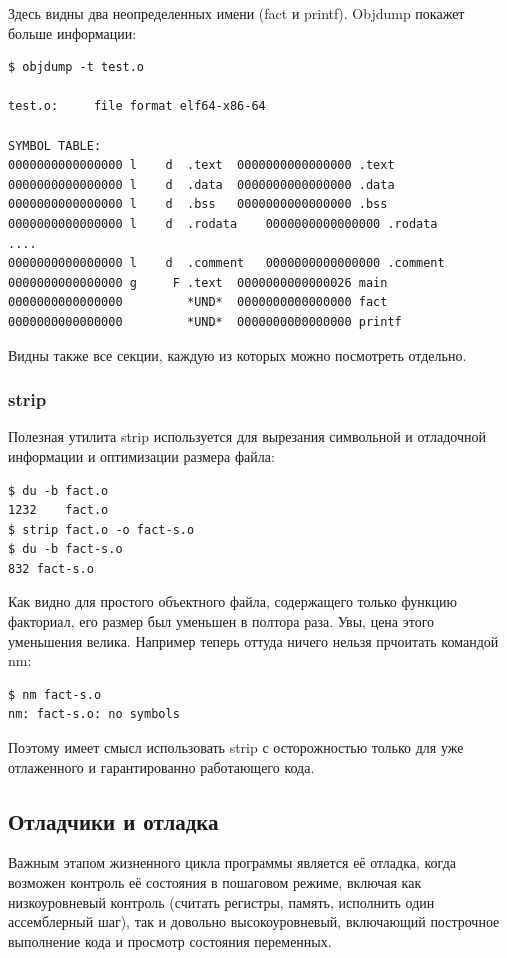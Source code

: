 \documentclass[a4paper,12pt,oneside]{article}
\begin{document}
Здесь видны два неопределенных имени (fact и printf). Objdump покажет больше информации:

\begin{verbatim}
$ objdump -t test.o

test.o:     file format elf64-x86-64

SYMBOL TABLE:
0000000000000000 l    d  .text	0000000000000000 .text
0000000000000000 l    d  .data	0000000000000000 .data
0000000000000000 l    d  .bss	0000000000000000 .bss
0000000000000000 l    d  .rodata	0000000000000000 .rodata
....
0000000000000000 l    d  .comment	0000000000000000 .comment
0000000000000000 g     F .text	0000000000000026 main
0000000000000000         *UND*	0000000000000000 fact
0000000000000000         *UND*	0000000000000000 printf
\end{verbatim}

Видны также все секции, каждую из которых можно посмотреть отдельно.

\subsubsection{strip}\label{subsubsec:Strip} 

Полезная утилита strip используется для вырезания символьной и отладочной информации и оптимизации размера файла:

\begin{verbatim}
$ du -b fact.o
1232	fact.o
$ strip fact.o -o fact-s.o
$ du -b fact-s.o
832	fact-s.o
\end{verbatim}

Как видно для простого объектного файла, содержащего только функцию факториал, его размер был уменьшен в полтора раза. Увы, цена этого уменьшения велика. Например теперь оттуда ничего нельзя прчоитать командой nm:

\begin{verbatim}
$ nm fact-s.o
nm: fact-s.o: no symbols
\end{verbatim}

Поэтому имеет смысл использовать strip с осторожностью только для уже отлаженного и гарантированно работающего кода.

\pagebreak
\subsection{Отладчики и отладка}\label{subsec:Debugger}

Важным этапом жизненного цикла программы является её отладка, когда возможен контроль её состояния в пошаговом режиме, включая как низкоуровневый контроль (считать регистры, память, исполнить один ассемблерный шаг), так и довольно высокоуровневый, включающий построчное выполнение кода и просмотр состояния переменных.
\end{document}
